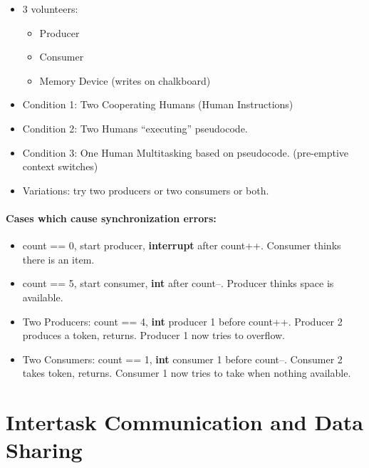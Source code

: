 \documentclass{article}	%
\begin{document}
\begin{itemize}
        \item 3 volunteers:
        \begin{itemize}
                \item Producer
                \item Consumer
                \item Memory Device (writes on chalkboard)
        \end{itemize}
        \item Condition 1: Two Cooperating Humans
                (Human Instructions)
        \item Condition 2: Two Humans ``executing''
                pseudocode.
        \item Condition 3: One Human Multitasking based
                on pseudocode. (pre-emptive context switches)
        \item Variations:  try two producers or two consumers
        or both.

\end{itemize}

\paragraph{Cases which cause synchronization errors:}

\begin{itemize}
        \item count == 0, start producer, {\bf interrupt} after count++.
        Consumer thinks there is an item.
        \item count == 5, start consumer, {\bf int} after count--.
        Producer thinks space is available.
        \item Two Producers: count == 4, {\bf int } producer 1  before count++.
        Producer 2 produces a token, returns.   Producer 1 now tries to
        overflow.
        \item Two Consumers:  count == 1, {\bf int} consumer 1 before count--.
        Consumer 2 takes token, returns.  Consumer 1 now tries to take when
        nothing available.
\end{itemize}



\section{Intertask Communication and Data Sharing}
\end{document}
